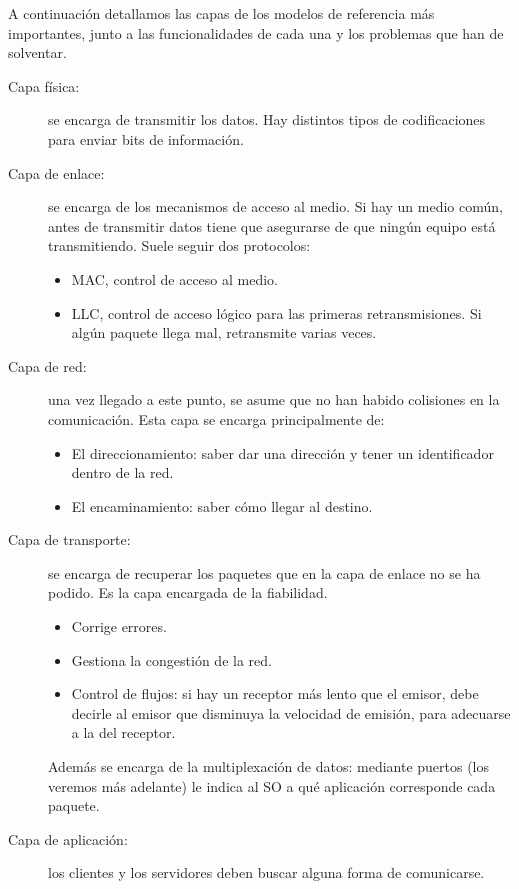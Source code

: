 A continuación detallamos las capas de los modelos de referencia más importantes, junto a las funcionalidades de cada una y los problemas que han de solventar.
\begin{description}
    \item [Capa física:] se encarga de transmitir los datos. Hay distintos tipos de codificaciones para enviar bits de información.
    \item [Capa de enlace:] se encarga de los mecanismos de acceso al medio. Si hay un medio común, antes de transmitir datos tiene que asegurarse de que ningún equipo está transmitiendo. Suele seguir dos protocolos: 
        \begin{itemize}
            \item \acrfull{MAC}, control de acceso al medio.
            \item \acrfull{LLC}, control de acceso lógico para las primeras retransmisiones. Si algún paquete llega mal, retransmite varias veces. 
        \end{itemize}
    
    \item [Capa de red:] una vez llegado a este punto, se asume que no han habido colisiones en la comunicación. Esta capa se encarga principalmente de: 
        \begin{itemize}
            \item El direccionamiento: saber dar una dirección y tener un identificador dentro de la red. 
            \item El encaminamiento: saber cómo llegar al destino. 
        \end{itemize}

    \item [Capa de transporte:] se encarga de recuperar los paquetes que en la capa de enlace no se ha podido. Es la capa encargada de la fiabilidad. 
        \begin{itemize}
            \item Corrige errores.
            \item Gestiona la congestión de la red.
            \item Control de flujos: si hay un receptor más lento que el emisor, debe decirle al emisor que disminuya la velocidad de emisión, para adecuarse a la del receptor. 
        \end{itemize}
    Además se encarga de la multiplexación de datos: mediante puertos (los veremos más adelante) le indica al SO a qué aplicación corresponde cada paquete. 
    \item [Capa de aplicación:] los clientes y los servidores deben buscar alguna forma de comunicarse. 
\end{description}

